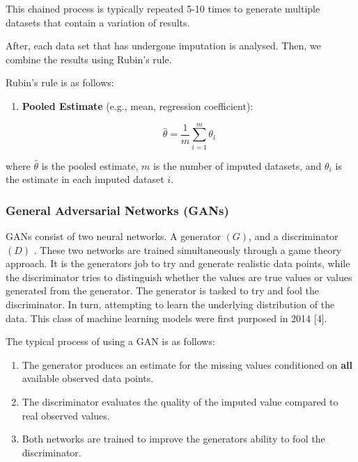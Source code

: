 \documentclass[
]{report}
\begin{document}
This chained process is typically repeated 5-10 times to generate
multiple datasets that contain a variation of results.

After, each data set that has undergone imputation is analysed. Then, we
combine the results using Rubin's rule.

Rubin's rule is as follows:

\begin{enumerate}
\def\labelenumi{\arabic{enumi}.}
\item
  \textbf{Pooled Estimate} (e.g., mean, regression coefficient):

  \[\hat{\theta} = \frac{1}{m}\sum_{i=1}^{m}\theta_{i}\]
\end{enumerate}

where \(\hat{\theta}\) is the pooled estimate, \(m\) is the number of
imputed datasets, and \(\theta_i\) is the estimate in each imputed
dataset \(i\).

\hypertarget{general-adversarial-networks-gans}{%
\subsubsection{General Adversarial Networks
(GANs)}\label{general-adversarial-networks-gans}}

GANs consist of two neural networks. A generator \((G)\), and a
discriminator \((D)\) . These two networks are trained simultaneously
through a game theory approach. It is the generators job to try and
generate realistic data points, while the discriminator tries to
distinguish whether the values are true values or values generated from
the generator. The generator is tasked to try and fool the
discriminator. In turn, attempting to learn the underlying distribution
of the data. This class of machine learning models were first purposed
in 2014 {[}4{]}.

The typical process of using a GAN is as follows:

\begin{enumerate}
\def\labelenumi{\arabic{enumi})}
\item
  The generator produces an estimate for the missing values conditioned
  on \textbf{all} available observed data points.
\item
  The discriminator evaluates the quality of the imputed value compared
  to real observed values.
\item
  Both networks are trained to improve the generators ability to fool
  the discriminator.
\end{enumerate}
\end{document}
